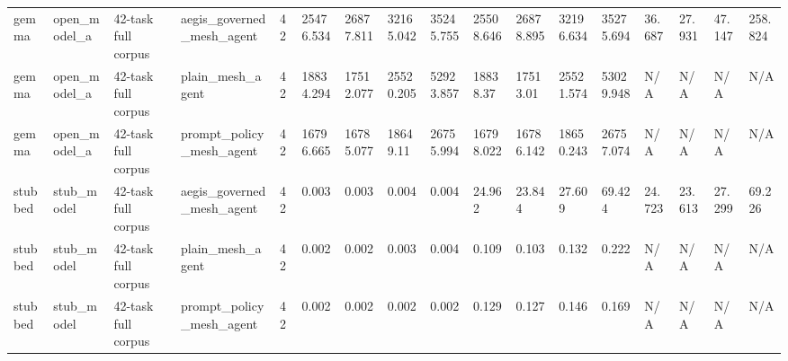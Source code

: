 \begin{tabular}{lllllllllllllllll}
gemma & open\_model\_a & 42-task full corpus & aegis\_governed\_mesh\_agent & 42 & 25476.534 & 26877.811 & 32165.042 & 35245.755 & 25508.646 & 26878.895 & 32196.634 & 35275.694 & 36.687 & 27.931 & 47.147 & 258.824 \\
gemma & open\_model\_a & 42-task full corpus & plain\_mesh\_agent & 42 & 18834.294 & 17512.077 & 25520.205 & 52923.857 & 18838.37 & 17513.01 & 25521.574 & 53029.948 & N/A & N/A & N/A & N/A \\
gemma & open\_model\_a & 42-task full corpus & prompt\_policy\_mesh\_agent & 42 & 16796.665 & 16785.077 & 18649.11 & 26755.994 & 16798.022 & 16786.142 & 18650.243 & 26757.074 & N/A & N/A & N/A & N/A \\
stubbed & stub\_model & 42-task full corpus & aegis\_governed\_mesh\_agent & 42 & 0.003 & 0.003 & 0.004 & 0.004 & 24.962 & 23.844 & 27.609 & 69.424 & 24.723 & 23.613 & 27.299 & 69.226 \\
stubbed & stub\_model & 42-task full corpus & plain\_mesh\_agent & 42 & 0.002 & 0.002 & 0.003 & 0.004 & 0.109 & 0.103 & 0.132 & 0.222 & N/A & N/A & N/A & N/A \\
stubbed & stub\_model & 42-task full corpus & prompt\_policy\_mesh\_agent & 42 & 0.002 & 0.002 & 0.002 & 0.002 & 0.129 & 0.127 & 0.146 & 0.169 & N/A & N/A & N/A & N/A \\
 \hline
\end{tabular}
